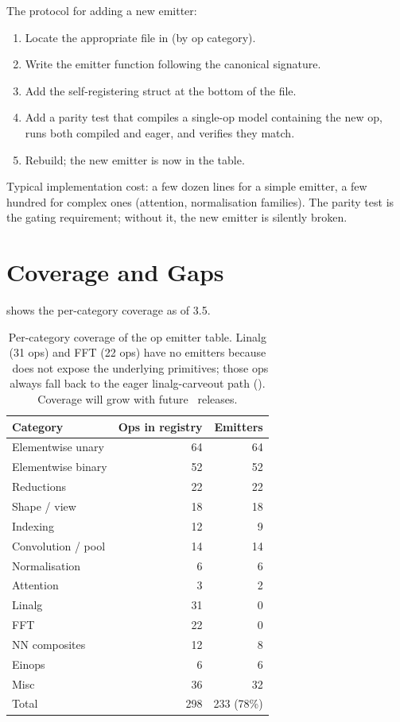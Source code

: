 The protocol for adding a new emitter:

\begin{enumerate}
  \item Locate the appropriate file in
     (by op category).
  \item Write the emitter function following the canonical
    signature.
  \item Add the self-registering struct at the bottom of the
    file.
  \item Add a parity test that compiles a single-op model
    containing the new op, runs both compiled and eager, and
    verifies they match.
  \item Rebuild; the new emitter is now in the table.
\end{enumerate}

Typical implementation cost: a few dozen lines for a simple
emitter, a few hundred for complex ones (attention,
normalisation families). The parity test is the gating
requirement; without it, the new emitter is silently broken.

\section{Coverage and Gaps}
\label{sec:op_emitters:coverage}

 shows the per-category
coverage as of 3.5.

\begin{table}[t]
\centering
\small
\begin{tabular}{lrr}
\toprule
Category & Ops in registry & Emitters \\
\midrule
Elementwise unary    & 64 & 64 \\
Elementwise binary   & 52 & 52 \\
Reductions           & 22 & 22 \\
Shape / view         & 18 & 18 \\
Indexing             & 12 & 9  \\
Convolution / pool   & 14 & 14 \\
Normalisation        & 6  & 6  \\
Attention            & 3  & 2  \\
Linalg               & 31 & 0  \\
FFT                  & 22 & 0  \\
NN composites        & 12 & 8  \\
Einops               & 6  & 6  \\
Misc                 & 36 & 32 \\
\midrule
Total                & 298 & 233 (78\%) \\
\bottomrule
\end{tabular}
\caption[Emitter coverage.]{Per-category coverage of the op
emitter table. Linalg (31 ops) and FFT (22 ops) have no emitters
because \MPSGraph\ does not expose the underlying primitives;
those ops always fall back to the eager linalg-carveout path
(). Coverage will grow with future
\MPSGraph\ releases.}
\label{tab:op_emitters:coverage}
\end{table}

